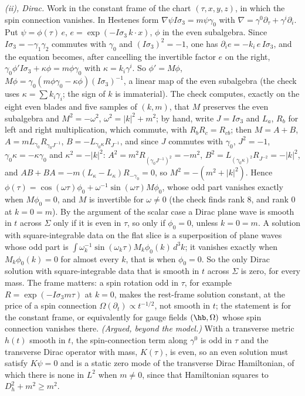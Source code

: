 \emph{(ii), Dirac.} Work in the constant frame of the chart $(\tau, x, y, z)$, in which the spin connection vanishes. In Hestenes form $\nabla\psi I\sigma_{3} = m\psi\gamma_{0}$ with $\nabla = \gamma^{0}\partial_{\tau} + \gamma^{i}\partial_{i}$. Put $\psi = \phi(\tau)\,e$, $e = \exp(-I\sigma_{3}\,k\cdot x)$, $\phi$ in the even subalgebra. Since $I\sigma_{3} = -\gamma_{1}\gamma_{2}$ commutes with $\gamma_{0}$ and $(I\sigma_{3})^{2} = -1$, one has $\partial_{i}e = -k_{i}\,e\,I\sigma_{3}$, and the equation becomes, after cancelling the invertible factor $e$ on the right, $\gamma_{0}\phi' I\sigma_{3} + \kappa\phi = m\phi\gamma_{0}$ with $\kappa = k_{i}\gamma^{i}$. So $\phi' = M\phi$, $M\phi = \gamma_{0}(m\phi\gamma_{0} - \kappa\phi)(I\sigma_{3})^{-1}$, a linear map of the even subalgebra (the check uses $\kappa = \sum k_{i}\gamma_{i}$; the sign of $k$ is immaterial). The check computes, exactly on the eight even blades and five samples of $(k, m)$, that $M$ preserves the even subalgebra and $M^{2} = -\omega^{2}$, $\omega^{2} = |k|^{2} + m^{2}$; by hand, write $J = I\sigma_{3}$ and $L_{a}$, $R_{b}$ for left and right multiplication, which commute, with $R_{b}R_{c} = R_{cb}$; then $M = A + B$, $A = m L_{\gamma_{0}}R_{\gamma_{0}J^{-1}}$, $B = -L_{\gamma_{0}\kappa}R_{J^{-1}}$, and since $J$ commutes with $\gamma_{0}$, $J^{2} = -1$, $\gamma_{0}\kappa = -\kappa\gamma_{0}$ and $\kappa^{2} = -|k|^{2}$: $A^{2} = m^{2}R_{(\gamma_{0}J^{-1})^{2}} = -m^{2}$, $B^{2} = L_{(\gamma_{0}\kappa)^{2}}R_{J^{-2}} = -|k|^{2}$, and $AB + BA = -m(L_{\kappa} - L_{\kappa})R_{-\gamma_{0}} = 0$, so $M^{2} = -(m^{2} + |k|^{2})$. Hence $\phi(\tau) = \cos(\omega\tau)\phi_{0} + \omega^{-1}\sin(\omega\tau)M\phi_{0}$, whose odd part vanishes exactly when $M\phi_{0} = 0$, and $M$ is invertible for $\omega \neq 0$ (the check finds rank $8$, and rank $0$ at $k = 0 = m$). By the argument of the scalar case a Dirac plane wave is smooth in $t$ across $\Sigma$ only if it is even in $\tau$, so only if $\phi_{0} = 0$, unless $k = 0 = m$. A solution with square-integrable data on the flat slice is a superposition of plane waves whose odd part is $\int \omega_{k}^{-1}\sin(\omega_{k}\tau)M_{k}\phi_{0}(k)\,d^{3}k$; it vanishes exactly when $M_{k}\phi_{0}(k) = 0$ for almost every $k$, that is when $\phi_{0} = 0$. So the only Dirac solution with square-integrable data that is smooth in $t$ across $\Sigma$ is zero, for every mass. The frame matters: a spin rotation odd in $\tau$, for example $R = \exp(-I\sigma_{3}m\tau)$ at $k = 0$, makes the rest-frame solution constant, at the price of a spin connection $\Omega(\partial_{t}) \propto t^{-1/2}$, not smooth in $t$; the statement is for the constant frame, or equivalently for gauge fields $(\hb, \Omega)$ whose spin connection vanishes there. \emph{(Argued, beyond the model.)} With a transverse metric $h(t)$ smooth in $t$, the spin-connection term along $\gamma^{0}$ is odd in $\tau$ and the transverse Dirac operator with mass, $K(\tau)$, is even, so an even solution must satisfy $K\psi = 0$ and is a static zero mode of the transverse Dirac Hamiltonian, of which there is none in $L^{2}$ when $m \neq 0$, since that Hamiltonian squares to $D_{h}^{2} + m^{2} \geq m^{2}$.


